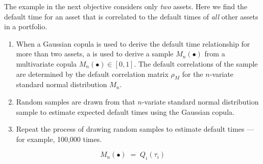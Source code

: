 
The example in the next objective considers only \textit{two} assets. Here we find the default
time for an asset that is correlated to the default times of \textit{all} other assets in a
portfolio.

\begin{mrkeybox}[title={Correlated default time --- the procedure}]
\begin{enumerate}[label=\textbf{\alph*)}]
\item When a Gaussian copula is used to derive the default time relationship for more than two
      assets, a  is used to derive a sample $M_n(\bullet)$ from a
      multivariate copula $M_n(\bullet) \in [0,1]$. The default correlations of the sample are
      determined by the default correlation matrix $\rho_M$ for the $n$-variate standard normal
      distribution $M_n$.
\item Random samples are drawn from that $n$-variate standard normal distribution sample to
      estimate expected default times using the Gaussian copula.
\item Repeat the process of drawing random samples to estimate default times --- for example,
      100,000 times.
\end{enumerate}
\end{mrkeybox}

\begin{mrfmlbox}
\[ M_n(\bullet) \;=\; Q_i(\tau_i) \]
\end{mrfmlbox}

